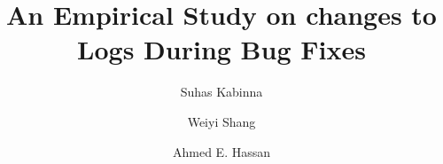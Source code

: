  
 \RequirePackage{fix-cm}
 \documentclass[smallextended]{svjour3}       %
 



%
\title{An Empirical Study on changes to Logs During Bug Fixes}

\author{Suhas Kabinna         \and
	Weiyi Shang \and
	Ahmed E. Hassan
}


